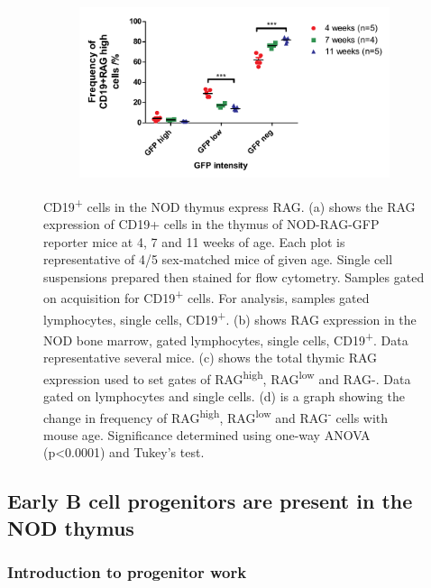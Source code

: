 \begin{figure}
\begin{subfigure}{0.5\textwidth}
	\caption{}
	\label{subfig:totalthyRAG}
	\end{subfigure}
	\begin{subfigure}{\textwidth}
	\includegraphics[width=\textwidth]{Figures/RAGhighlownegative.pdf}
	\caption{}
	\label{subfig:RAGhighlowneggraph}
	\end{subfigure}
\caption[Some CD19\textsuperscript{+} cells in the thymus appear to be expressing RAG]{CD19\textsuperscript{+} cells in the NOD thymus express RAG. 
(a) shows the RAG expression of CD19+ cells in the thymus of NOD-RAG-GFP reporter mice at 4, 7 and 11 weeks of age. Each plot is representative of 4/5 sex-matched mice of given age. Single cell suspensions prepared then stained for flow cytometry. Samples gated on acquisition for CD19\textsuperscript{+} cells. For analysis, samples gated lymphocytes, single cells, CD19\textsuperscript{+}. (b) shows RAG expression in the NOD bone marrow, gated lymphocytes, single cells, CD19\textsuperscript{+}. Data representative several mice. (c) shows the total thymic RAG expression used to set gates of RAG\textsuperscript{high}, RAG\textsuperscript{low} and RAG-. Data gated on lymphocytes and single cells. (d) is a graph showing the change in frequency of RAG\textsuperscript{high}, RAG\textsuperscript{low} and RAG\textsuperscript{-} cells with mouse age. Significance determined using one-way ANOVA (p<0.0001) and Tukey's test.} 
\end{figure}




\subsection{Early B cell progenitors are present in the NOD thymus}
\label{subsec:earlyprogens}

\subsubsection{Introduction to progenitor work}

